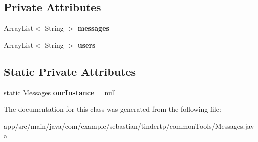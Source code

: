 \subsection*{Private Attributes}
\begin{DoxyCompactItemize}
\item 
Array\+List$<$ String $>$ {\bfseries messages}\hypertarget{classcom_1_1example_1_1sebastian_1_1tindertp_1_1commonTools_1_1Messages_ac3ae46153a77459de8e007b743bbc40a}{}\label{classcom_1_1example_1_1sebastian_1_1tindertp_1_1commonTools_1_1Messages_ac3ae46153a77459de8e007b743bbc40a}

\item 
Array\+List$<$ String $>$ {\bfseries users}\hypertarget{classcom_1_1example_1_1sebastian_1_1tindertp_1_1commonTools_1_1Messages_aa9b723f2c63aba9fc66b75273a0b630d}{}\label{classcom_1_1example_1_1sebastian_1_1tindertp_1_1commonTools_1_1Messages_aa9b723f2c63aba9fc66b75273a0b630d}

\end{DoxyCompactItemize}
\subsection*{Static Private Attributes}
\begin{DoxyCompactItemize}
\item 
static \hyperlink{classcom_1_1example_1_1sebastian_1_1tindertp_1_1commonTools_1_1Messages}{Messages} {\bfseries our\+Instance} = null\hypertarget{classcom_1_1example_1_1sebastian_1_1tindertp_1_1commonTools_1_1Messages_a46621dc7de3218de6809e4d22d34a538}{}\label{classcom_1_1example_1_1sebastian_1_1tindertp_1_1commonTools_1_1Messages_a46621dc7de3218de6809e4d22d34a538}

\end{DoxyCompactItemize}


The documentation for this class was generated from the following file\+:\begin{DoxyCompactItemize}
\item 
app/src/main/java/com/example/sebastian/tindertp/common\+Tools/Messages.\+java\end{DoxyCompactItemize}
